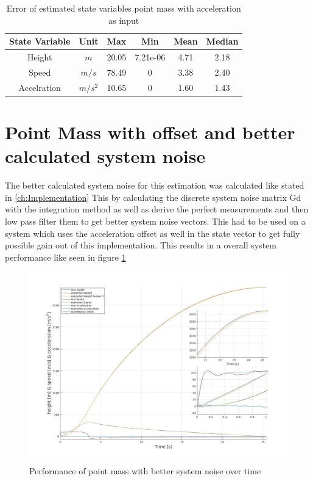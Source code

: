 \begin{table}[h!]
\centering
\begin{tabular}{cccccc}
\hline
\multicolumn{1}{|c|}{State Variable} & \multicolumn{1}{c|}{Unit} & \multicolumn{1}{c|}{Max} & \multicolumn{1}{c|}{Min} & \multicolumn{1}{c|}{Mean} & \multicolumn{1}{c|}{Median} \\ \hline
Height                            & $m$                         & 20.05                  & 7.21e-06                 & 4.71                    & 2.18                      \\
Speed                             & $m/s$                       & 78.49                  & 0                        & 3.38                    & 2.40                      \\
Accelration                       & $m/s^2$   			& 10.65                  & 0                        & 1.60                    & 1.43                     
\end{tabular}
\caption{Error of estimated state variables point mass with acceleration as input}
\label{tab:ErrorPointMassAccelerationInput}
\end{table}

\newpage
\section{Point Mass with offset and better calculated system noise}
The better calculated system noise for this estimation was calculated like stated in \ref{ch:Implementation}
This by calculating the discrete system noise matrix Gd with the integration method as well as
derive the perfect measurements and then low pass filter them to get better system noise vectors.
This had to be used on a system which uses the acceleration offset as well in the state vector to get fully possible gain out of this implementation.
This results in a overall system performance like seen in figure \ref{fig:PointMassBetterNoisePerformance}

\begin{figure}[h!]
 \centering
 \includegraphics[width=.8 \textwidth]{./Pictures/PointMassBetterNoisePerformance.jpg}
 \caption{Performance of point mass with better system noise over time}
 \label{fig:PointMassBetterNoisePerformance}
\end{figure}

